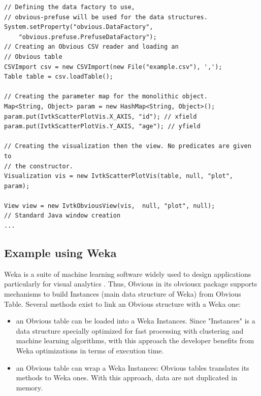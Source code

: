 \begin{lstlisting}
// Defining the data factory to use,
// obvious-prefuse will be used for the data structures.
System.setProperty("obvious.DataFactory",
    "obvious.prefuse.PrefuseDataFactory");
// Creating an Obvious CSV reader and loading an
// Obvious table
CSVImport csv = new CSVImport(new File("example.csv"), ',');
Table table = csv.loadTable();

// Creating the parameter map for the monolithic object.
Map<String, Object> param = new HashMap<String, Object>();
param.put(IvtkScatterPlotVis.X_AXIS, "id"); // xfield
param.put(IvtkScatterPlotVis.Y_AXIS, "age"); // yfield

// Creating the visualization then the view. No predicates are given to
// the constructor.
Visualization vis = new IvtkScatterPlotVis(table, null, "plot", param);

View view = new IvtkObviousView(vis,  null, "plot", null);
// Standard Java window creation
...
\end{lstlisting}

\subsection{Example using Weka}

Weka \cite{Weka} is a suite of machine learning software widely used to design applications particularly for visual analytics . Thus, Obvious in its obviousx package supports mechanisms to build Instances (main data structure of Weka) from Obvious Table. Several methods exist to link an Obvious structure with a Weka one:

\begin{itemize}
\item an Obvious table can be loaded into a Weka Instances. Since "Instances" is a data structure specially optimized for fast processing with clustering and machine learning algorithms, with this approach the developer benefits from Weka optimizations in terms of execution time.
\item an Obvious table can wrap a Weka Instances: Obvious tables translates its methods to Weka ones. With this approach, data are not duplicated in memory.
\end{itemize}


